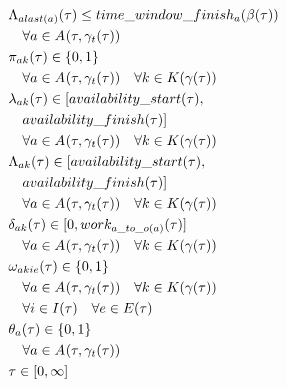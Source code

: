 \begin{alignat}{2}
	& \Lambda_{a last(a)}(\tau) \leq time\_window\_finish_{a}(\beta_{}(\tau)) \notag\\
	& \quad \forall a \in A_{}(\tau, \gamma_{t}(\tau))                                                  \\
	& \pi_{ak}(\tau) \in \{0, 1\} \notag\\
	& \quad \forall a \in A_{}(\tau, \gamma_{t}(\tau)) \quad \forall k \in K(\gamma_{}(\tau))                                          \\
	& \lambda_{ak}(\tau) \in [availability\_start(\tau), \notag\\
	& \quad availability\_finish(\tau)] \notag\\
	& \quad \forall a \in A_{}(\tau, \gamma_{t}(\tau)) \quad \forall k \in K(\gamma_{}(\tau))  \\
	& \Lambda_{ak}(\tau) \in [availability\_start(\tau), \notag\\
	& \quad availability\_finish(\tau)] \notag\\
	& \quad \forall a \in A_{}(\tau, \gamma_{t}(\tau)) \quad \forall k \in K(\gamma_{}(\tau)) \\
	& \delta_{ak}(\tau) \in [0, work_{a\_to\_o(a)}(\tau) ] \notag\\
	& \quad \forall a \in A_{}(\tau, \gamma_{t}(\tau)) \quad \forall k \in K(\gamma_{}(\tau))                                               \\
	& \omega_{aki e}(\tau) \in \{0 , 1\} \notag\\                                                                                                                                
	& \quad \forall a \in A_{}(\tau, \gamma_{t}(\tau)) \quad \forall k \in K(\gamma_{}(\tau)) \notag\\
	& \quad \forall i \in I(\tau) \quad \forall e \in E(\tau) \\
	& \theta_{a}(\tau) \in \{0, 1\} \notag\\
	& \quad \forall a \in A_{}(\tau, \gamma_{t}(\tau))\\
	& \tau \in [0, \infty] 
\end{alignat}

